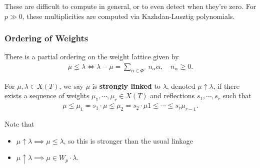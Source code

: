 \begin{warning}

\begin{warning}

These are difficult to compute in general, or to even detect when
they're zero. For \(p\gg 0\), these multiplicities are computed via
Kazhdan-Lusztig polynomials.

\end{warning}

\end{warning}

\hypertarget{ordering-of-weights}{%
\subsubsection{Ordering of Weights}\label{ordering-of-weights}}

There is a partial ordering on the weight lattice given by
\begin{align*}   \mu \leq \lambda \iff \lambda - \mu = \sum_{\alpha\in \Phi^+} n_\alpha \alpha, \quad n_\alpha \geq 0 .\end{align*}

\begin{definition}

\begin{definition}

For \(\mu, \lambda \in X(T)\), we say \(\mu\) is \textbf{strongly
linked} to \(\lambda\), denoted \(\mu \uparrow \lambda\), if there
exists a sequence of weights \(\mu_1, \cdots, \mu_r \in X(T)\) and
reflections \(s_1, \cdots, s_r\) such that
\begin{align*}   \mu \leq \mu_1 = s_1 \cdot \mu \leq \mu_2 = s_2\cdot \mu 1 \leq \cdots \leq s_r \mu_{r-1} .\end{align*}

\end{definition}

\end{definition}

\begin{remark}

\begin{remark}

Note that

\begin{itemize}
\tightlist
\item
  \(\mu \uparrow \lambda \implies \mu \leq \lambda\), so this is
  stronger than the usual linkage
\item
  \(\mu \uparrow \lambda \implies \mu \in W_p \cdot \lambda\).
\end{itemize}

\end{remark}

\end{remark}

